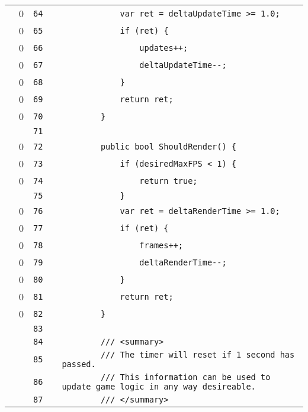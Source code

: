 \documentclass[a4paper,landscape,10pt]{article}
\begin{document}
\begin{longtable}[l]{lrrll}
\cellcolor{red} & 0 & \verb~64~ & & \verb~            var ret = deltaUpdateTime >= 1.0;~\\
\cellcolor{red} & 0 & \verb~65~ & & \verb~            if (ret) {~\\
\cellcolor{red} & 0 & \verb~66~ & & \verb~                updates++;~\\
\cellcolor{red} & 0 & \verb~67~ & & \verb~                deltaUpdateTime--;~\\
\cellcolor{red} & 0 & \verb~68~ & & \verb~            }~\\
\cellcolor{red} & 0 & \verb~69~ & & \verb~            return ret;~\\
\cellcolor{red} & 0 & \verb~70~ & & \verb~        }~\\
\cellcolor{gray} &  & \verb~71~ & & \verb~~\\
\cellcolor{red} & 0 & \verb~72~ & & \verb~        public bool ShouldRender() {~\\
\cellcolor{red} & 0 & \verb~73~ & & \verb~            if (desiredMaxFPS < 1) {~\\
\cellcolor{red} & 0 & \verb~74~ & & \verb~                return true;~\\
\cellcolor{gray} &  & \verb~75~ & & \verb~            }~\\
\cellcolor{red} & 0 & \verb~76~ & & \verb~            var ret = deltaRenderTime >= 1.0;~\\
\cellcolor{red} & 0 & \verb~77~ & & \verb~            if (ret) {~\\
\cellcolor{red} & 0 & \verb~78~ & & \verb~                frames++;~\\
\cellcolor{red} & 0 & \verb~79~ & & \verb~                deltaRenderTime--;~\\
\cellcolor{red} & 0 & \verb~80~ & & \verb~            }~\\
\cellcolor{red} & 0 & \verb~81~ & & \verb~            return ret;~\\
\cellcolor{red} & 0 & \verb~82~ & & \verb~        }~\\
\cellcolor{gray} &  & \verb~83~ & & \verb~~\\
\cellcolor{gray} &  & \verb~84~ & & \verb~        /// <summary>~\\
\cellcolor{gray} &  & \verb~85~ & & \verb~        /// The timer will reset if 1 second has passed.~\\
\cellcolor{gray} &  & \verb~86~ & & \verb~        /// This information can be used to update game logic in any way desireable.~\\
\cellcolor{gray} &  & \verb~87~ & & \verb~        /// </summary>~\\

\end{longtable}
\end{document}
